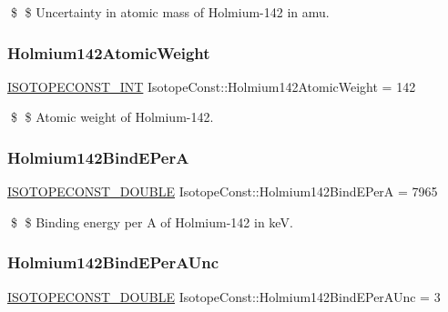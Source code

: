 \$ \$ Uncertainty in atomic mass of Holmium-\/142 in amu. \mbox{\label{group___isotope_const-_holmium-_ho142_ga9b1a48f037c5de1b7780e112f432ebfa}} 
\subsubsection{\texorpdfstring{Holmium142\+Atomic\+Weight}{Holmium142AtomicWeight}}
{\footnotesize\ttfamily \mbox{\hyperlink{group___isotope_const-_macros_ga5f18360b3e99483a35c32d789e62621c}{I\+S\+O\+T\+O\+P\+E\+C\+O\+N\+S\+T\+\_\+\+I\+NT}} Isotope\+Const\+::\+Holmium142\+Atomic\+Weight = 142}

\$ \$ Atomic weight of Holmium-\/142. \mbox{\label{group___isotope_const-_holmium-_ho142_gae2498305f970f9ea2b0aec596619070f}} 
\subsubsection{\texorpdfstring{Holmium142\+Bind\+E\+PerA}{Holmium142BindEPerA}}
{\footnotesize\ttfamily \mbox{\hyperlink{group___isotope_const-_macros_ga8f45a7272ce02c0b4c65c44636ed719a}{I\+S\+O\+T\+O\+P\+E\+C\+O\+N\+S\+T\+\_\+\+D\+O\+U\+B\+LE}} Isotope\+Const\+::\+Holmium142\+Bind\+E\+PerA = 7965}

\$ \$ Binding energy per A of Holmium-\/142 in keV. \mbox{\label{group___isotope_const-_holmium-_ho142_ga382fbaa1d5544eceb0d22f9a0b16186b}} 
\subsubsection{\texorpdfstring{Holmium142\+Bind\+E\+Per\+A\+Unc}{Holmium142BindEPerAUnc}}
{\footnotesize\ttfamily \mbox{\hyperlink{group___isotope_const-_macros_ga8f45a7272ce02c0b4c65c44636ed719a}{I\+S\+O\+T\+O\+P\+E\+C\+O\+N\+S\+T\+\_\+\+D\+O\+U\+B\+LE}} Isotope\+Const\+::\+Holmium142\+Bind\+E\+Per\+A\+Unc = 3}

